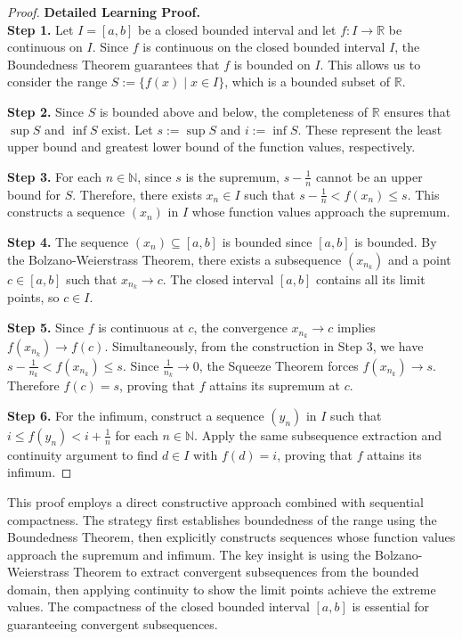 \begin{proof}
\textbf{Detailed Learning Proof.}~\\

\textbf{Step 1.} Let $I=[a,b]$ be a closed bounded interval and let $f : I \to \mathbb{R}$ be continuous on $I$. Since $f$ is continuous on the closed bounded interval $I$, the Boundedness Theorem guarantees that $f$ is bounded on $I$. This allows us to consider the range $S:=\{f(x)\mid x\in I\}$, which is a bounded subset of $\mathbb{R}$.

\textbf{Step 2.} Since $S$ is bounded above and below, the completeness of $\mathbb{R}$ ensures that $\sup S$ and $\inf S$ exist. Let $s := \sup S$ and $i := \inf S$. These represent the least upper bound and greatest lower bound of the function values, respectively.

\textbf{Step 3.} For each $n\in\mathbb{N}$, since $s$ is the supremum, $s-\frac{1}{n}$ cannot be an upper bound for $S$. Therefore, there exists $x_n\in I$ such that $s-\frac{1}{n}<f(x_n)\le s$. This constructs a sequence $(x_n)$ in $I$ whose function values approach the supremum.

\textbf{Step 4.} The sequence $(x_n)\subseteq[a,b]$ is bounded since $[a,b]$ is bounded. By the Bolzano-Weierstrass Theorem, there exists a subsequence $(x_{n_k})$ and a point $c\in[a,b]$ such that $x_{n_k}\to c$. The closed interval $[a,b]$ contains all its limit points, so $c\in I$.

\textbf{Step 5.} Since $f$ is continuous at $c$, the convergence $x_{n_k}\to c$ implies $f(x_{n_k})\to f(c)$. Simultaneously, from the construction in Step 3, we have $s-\frac{1}{n_k}<f(x_{n_k})\le s$. Since $\frac{1}{n_k}\to 0$, the Squeeze Theorem forces $f(x_{n_k})\to s$. Therefore $f(c)=s$, proving that $f$ attains its supremum at $c$.

\textbf{Step 6.} For the infimum, construct a sequence $(y_n)$ in $I$ such that $i\le f(y_n)<i+\frac{1}{n}$ for each $n\in\mathbb{N}$. Apply the same subsequence extraction and continuity argument to find $d\in I$ with $f(d)=i$, proving that $f$ attains its infimum.
\end{proof}

\begin{remark*}
This proof employs a direct constructive approach combined with sequential compactness. The strategy first establishes boundedness of the range using the Boundedness Theorem, then explicitly constructs sequences whose function values approach the supremum and infimum. The key insight is using the Bolzano-Weierstrass Theorem to extract convergent subsequences from the bounded domain, then applying continuity to show the limit points achieve the extreme values. The compactness of the closed bounded interval $[a,b]$ is essential for guaranteeing convergent subsequences.
\end{remark*}

